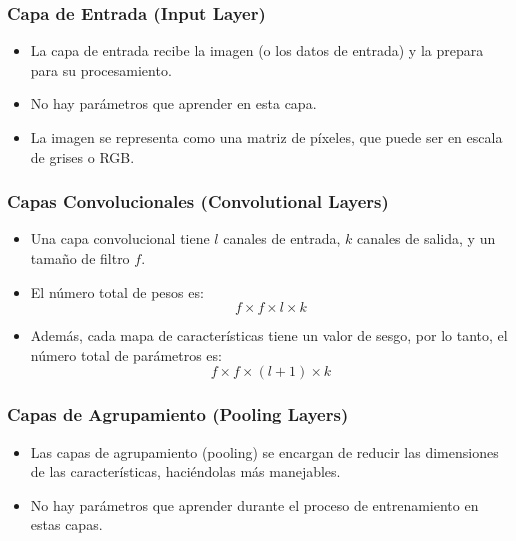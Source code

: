 \begin{frame}
    \frametitle{Capa de Entrada (Input Layer)}
    
    \begin{itemize}
        \item La capa de entrada recibe la imagen (o los datos de entrada) y la prepara para su procesamiento.
        \item No hay parámetros que aprender en esta capa.
        \item La imagen se representa como una matriz de píxeles, que puede ser en escala de grises o RGB.
    \end{itemize}

\end{frame}

\begin{frame}
    \frametitle{Capas Convolucionales (Convolutional Layers)}

    \begin{itemize}
        \item Una capa convolucional tiene \( l \) canales de entrada, \( k \) canales de salida, y un tamaño de filtro \( f \).
        \item El número total de pesos es:
        \[
        f \times f \times l \times k
        \]
        \item Además, cada mapa de características tiene un valor de sesgo, por lo tanto, el número total de parámetros es:
        \[
        f \times f \times (l + 1) \times k
        \]
    \end{itemize}
    
\end{frame}

\begin{frame}
    \frametitle{Capas de Agrupamiento (Pooling Layers)}

    \begin{itemize}
        \item Las capas de agrupamiento (pooling) se encargan de reducir las dimensiones de las características, haciéndolas más manejables.
        \item No hay parámetros que aprender durante el proceso de entrenamiento en estas capas.
    \end{itemize}

\end{frame}

